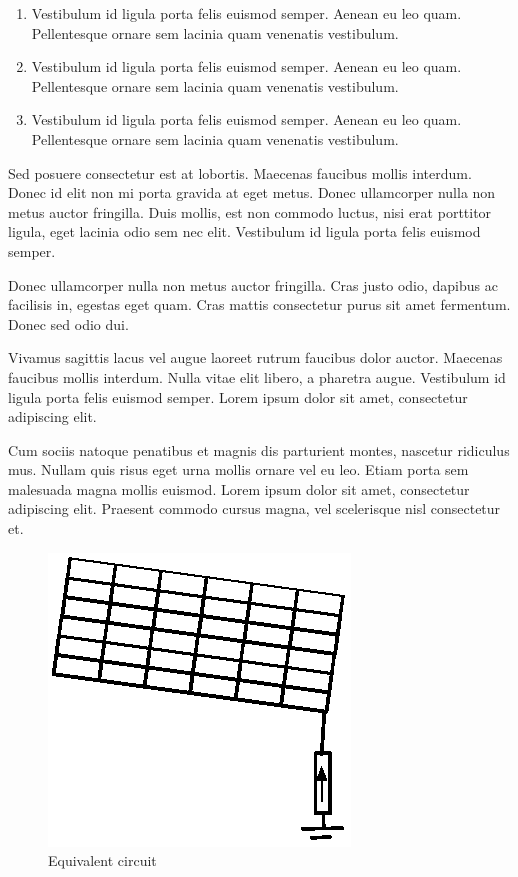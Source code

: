 \documentclass[journal]{../template/IEEEtran}
\begin{document}
\begin{enumerate}
	\item Vestibulum id ligula porta felis euismod semper. Aenean eu leo quam. Pellentesque ornare sem lacinia quam venenatis vestibulum.
	\item Vestibulum id ligula porta felis euismod semper. Aenean eu leo quam. Pellentesque ornare sem lacinia quam venenatis vestibulum.
	\item Vestibulum id ligula porta felis euismod semper. Aenean eu leo quam. Pellentesque ornare sem lacinia quam venenatis vestibulum.
\end{enumerate}

Sed posuere consectetur est at lobortis. Maecenas faucibus mollis interdum. Donec id elit non mi porta gravida at eget metus. Donec ullamcorper nulla non metus auctor fringilla. Duis mollis, est non commodo luctus, nisi erat porttitor ligula, eget lacinia odio sem nec elit. Vestibulum id ligula porta felis euismod semper.

Donec ullamcorper nulla non metus auctor fringilla. Cras justo odio, dapibus ac facilisis in, egestas eget quam. Cras mattis consectetur purus sit amet fermentum. Donec sed odio dui.

Vivamus sagittis lacus vel augue laoreet rutrum faucibus dolor auctor. Maecenas faucibus mollis interdum. Nulla vitae elit libero, a pharetra augue. Vestibulum id ligula porta felis euismod semper. Lorem ipsum dolor sit amet, consectetur adipiscing elit.

Cum sociis natoque penatibus et magnis dis parturient montes, nascetur ridiculus mus. Nullam quis risus eget urna mollis ornare vel eu leo. Etiam porta sem malesuada magna mollis euismod. Lorem ipsum dolor sit amet, consectetur adipiscing elit. Praesent commodo cursus magna, vel scelerisque nisl consectetur et.

\begin{figure}[!tb]
	\centering
		\includegraphics[width=2.9 in]{../resources/image.eps}
		\caption{Equivalent circuit}
	\label{fig:circuitoequivalente}
\end{figure}
\end{document}
